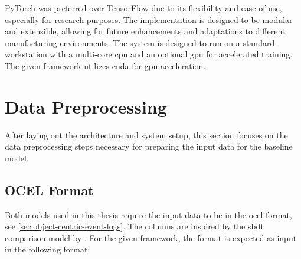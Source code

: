 PyTorch was preferred over TensorFlow due to its flexibility and ease of use, especially for research purposes. The implementation is designed to be modular and extensible, allowing for future enhancements and adaptations to different manufacturing environments.
The system is designed to run on a standard workstation with a multi-core \gls{cpu} and an optional \gls{gpu} for accelerated training. The given framework utilizes \gls{cuda} \autocite{NVIDIA_CUDA} for \gls{gpu} acceleration.

\section*{Data Preprocessing}
\label{sec:event_log_processing}

After laying out the architecture and system setup, this section focuses on the data preprocessing steps necessary for preparing the input data for the baseline model.

\subsection{OCEL Format}

Both models used in this thesis require the input data to be in the \gls{ocel} format, see \autoref{sec:object-centric-event-logs}. The columns are inspired by the \gls{sbdt} comparison model by \textcite{Schwede2024}. For the given framework, the format is expected as input in the following format:

